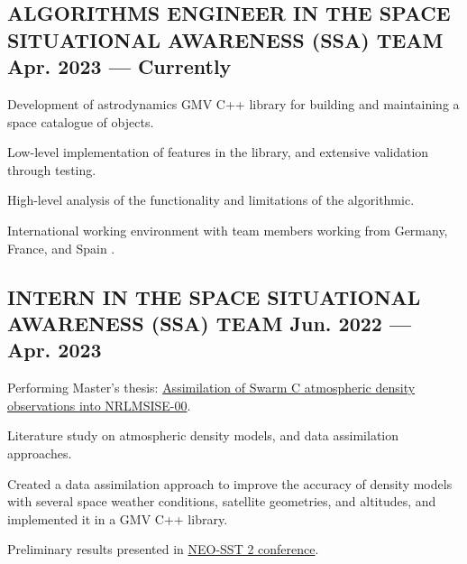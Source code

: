 \documentclass[letter,10pt]{article}
\begin{document}
\subsection{{ALGORITHMS ENGINEER IN THE SPACE SITUATIONAL AWARENESS (SSA) TEAM \hfill Apr. 2023  --- Currently}}
\begin{zitemize}
\item Development of astrodynamics GMV C++ library for building and maintaining a space catalogue of objects.
\begin{zitemize}
    \item Low-level implementation of features in the library, and extensive validation through testing.
    \item High-level analysis of the functionality and limitations of the algorithmic.
    \item International working environment with team members working from Germany, France, and Spain .
\end{zitemize}
\end{zitemize}
\subsection{{INTERN IN THE SPACE SITUATIONAL AWARENESS (SSA) TEAM \hfill Jun. 2022  --- Apr. 2023}}
\begin{zitemize}
\item Performing Master's thesis: \href{https://repository.tudelft.nl/islandora/object/uuid:f472201e-0e32-4b9e-8aa3-04521908396a}{Assimilation of Swarm C atmospheric density observations into NRLMSISE-00}.
\begin{zitemize}
    \item Literature study on atmospheric density models, and data assimilation approaches.
    \item Created a data assimilation approach to improve the accuracy of density models with several space weather conditions, satellite geometries, and altitudes, and implemented it in a GMV C++ library.
    \item Preliminary results presented in \href{https://conference.sdo.esoc.esa.int/proceedings/neosst2/paper/90/NEOSST2-paper90.pdf}{NEO-SST 2 conference}.
\end{zitemize}
\end{zitemize}
\end{document}
